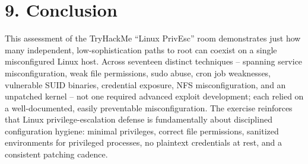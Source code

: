 \documentclass[11pt]{article}
\begin{document}
\section{9. Conclusion}

This assessment of the TryHackMe ``Linux PrivEsc'' room demonstrates just how many independent,
low-sophistication paths to root can coexist on a single misconfigured Linux host. Across
seventeen distinct techniques -- spanning service misconfiguration, weak file permissions, sudo
abuse, cron job weaknesses, vulnerable SUID binaries, credential exposure, NFS misconfiguration,
and an unpatched kernel -- not one required advanced exploit development; each relied on a
well-documented, easily preventable misconfiguration. The exercise reinforces that Linux
privilege-escalation defense is fundamentally about disciplined configuration hygiene: minimal
privileges, correct file permissions, sanitized environments for privileged processes, no
plaintext credentials at rest, and a consistent patching cadence.
\end{document}
